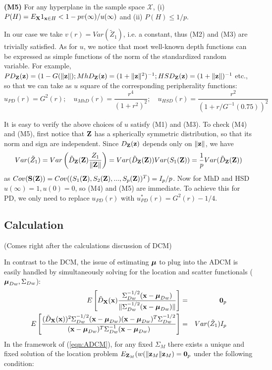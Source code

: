 \documentclass[12pt,letterpaper]{article}
\theoremstyle{definition} \newtheorem{Definition}[Theorem]{Definition}
\begin{document}
\noindent\textbf{(M5)} For any hyperplane in the sample space $\mathcal X$, (i) $P(H) = E_{\mathbf{X}} 1_{{\bf{x}} \in H} < 1 - p v(\infty) / u(\infty)$ and (ii) $P(H) \leq 1/p$.
%

\vspace{1em}
\noindent In our case we take $v(r) = Var(\tilde Z_1)$, i.e. a constant, thus (M2) and (M3) are trivially satisfied. As for $u$, we notice that most well-known depth functions can be expressed as simple functions of the norm of the standardized random variable. For example, $PD_{\mathbf{Z}} ({\bf{z}}) = (1 - G(\| {\bf{z}} \|); MhD_{\mathbf{Z}} ({\bf{z}}) = (1+\| {\bf{z}} \|^2)^{-1}; HSD_{\mathbf{Z}} ({\bf{z}}) = (1+\| {\bf{z}} \|)^{-1}$ etc., so that we can take as $u$ square of the corresponding peripherality functions:
$$
u_{PD} (r) = G^2 (r); \quad u_{MhD}(r)  = \frac{r^4}{(1 + r^2)^2}; \quad u_{HSD}(r)  = \frac{r^2}{(1 + r/G^{-1}(0.75))^2}
$$
%

It is easy to verify the above choices of $u$ satisfy (M1) and (M3). To check (M4) and (M5), first notice that ${\mathbf{Z}}$ has a spherically symmetric distribution, so that its norm and sign are independent. Since $D_{\mathbf{Z}}({\bf{z}})$ depends only on $\| {\bf{z}} \|$, we have
%
$$
Var (\tilde Z_1) = Var \left( \tilde D_{\mathbf{Z}} ({\mathbf{Z}}) \frac{Z_1}{ \|{\mathbf{Z}} \|} \right) = Var (\tilde D_{\mathbf{Z}} ({\mathbf{Z}})) Var (S_1 ({\mathbf{Z}})) = \frac{1}{p} Var (\tilde D_{\mathbf{Z}} ({\mathbf{Z}}))
$$
%
as $Cov({\mathbf{S}}({\mathbf{Z}})) = Cov((S_1({\mathbf{Z}}), S_2({\mathbf{Z}}), ..., S_p({\mathbf{Z}}))^T) = I_p/p$. Now for MhD and HSD $u(\infty)=1, u(0)=0$, so (M4) and (M5) are immediate. To achieve this for PD, we only need to replace $u_{PD}(r)$ with $u_{PD}^*(r) = G^2(r) - 1/4$.

\subsection{Calculation}
(Comes right after the calculations discussion of DCM)

In contrast to the DCM, the issue of estimating ${\boldsymbol{\mu}}$ to plug into the ADCM is easily handled by simultaneously solving for the location and scatter functionals (${\boldsymbol{\mu}}_{Dw}, \Sigma_{Dw}$):
%
\begin{eqnarray}
E \left[ \tilde D_{\mathbf{X}} ({\bf{x}}) \frac{\Sigma_{Dw}^{-1/2} ({\bf{x}} - {\boldsymbol{\mu}}_{Dw})}{ \| \Sigma_{Dw}^{-1/2}({\bf{x}} - {\boldsymbol{\mu}}_{Dw}) \|} \right] &=& {\bf 0}_p \label{eqn:AffineMedian}\\
E \left[ \frac{(\tilde D_{\mathbf{X}}({\bf{x}}))^2 \Sigma_{Dw}^{-1/2} ({\bf{x}} - {\boldsymbol{\mu}}_{Dw}) ({\bf{x}} - {\boldsymbol{\mu}}_{Dw})^T \Sigma_{Dw}^{-1/2}}{({\bf{x}} - {\boldsymbol{\mu}}_{Dw})^T \Sigma_{Dw}^{-1} ({\bf{x}} - {\boldsymbol{\mu}}_{Dw})} \right] &=& Var (\tilde Z_1) I_p \label{eqn:AffineCov}
\end{eqnarray}
%
In the framework of (\ref{eqn:ADCM}), for any fixed $\Sigma_M$ there exists a unique and fixed solution of the location problem $E_{{\mathbf{Z}}_M} (w(\| {\bf{z}}_M \| {\bf{z}}_M) = {\bf 0}_p $ under the following condition:
\end{document}
